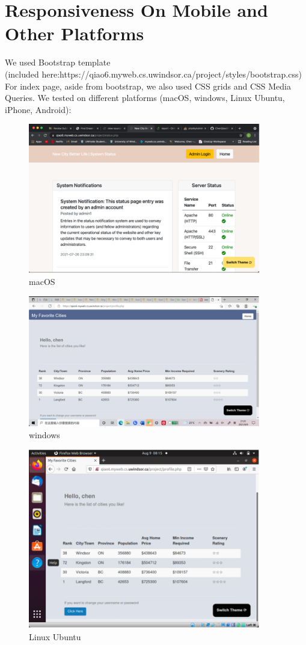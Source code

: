 \documentclass[12pt, letterpaper]{article}
\begin{document}
\section{Responsiveness On Mobile and Other Platforms}

We used Bootstrap template \\(included here:https://qiao6.myweb.cs.uwindsor.ca/project/styles/bootstrap.css) 
\\For index page, aside from bootstrap, we also used CSS grids and CSS Media Queries. 
We tested on different platforms (macOS, windows, Linux Ubuntu, iPhone, Android):

\begin{figure}[htbp]
	\centering
	\includegraphics[width=4in]{images/q12-macOS.png}
	\caption{macOS}
 \end{figure}
 
 \begin{figure}[htbp]
	\centering
	\includegraphics[width=4in]{images/q12-windows.png}
	\caption{windows}
 \end{figure}

 \newpage
 
 \begin{figure}[htbp]
	\centering
	\includegraphics[width=4in]{images/q12linuxUbuntu.png}
	\caption{Linux Ubuntu}
 \end{figure}
 
\end{document}
